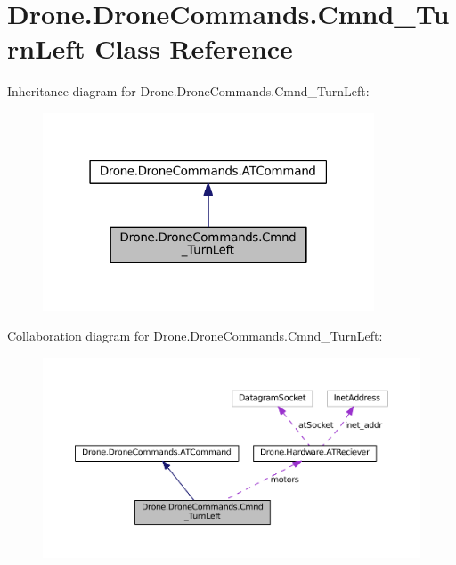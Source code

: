 \hypertarget{class_drone_1_1_drone_commands_1_1_cmnd___turn_left}{}\section{Drone.\+Drone\+Commands.\+Cmnd\+\_\+\+Turn\+Left Class Reference}
\label{class_drone_1_1_drone_commands_1_1_cmnd___turn_left}


Inheritance diagram for Drone.\+Drone\+Commands.\+Cmnd\+\_\+\+Turn\+Left\+:\nopagebreak
\begin{figure}[H]
\begin{center}
\leavevmode
\includegraphics[width=279pt]{class_drone_1_1_drone_commands_1_1_cmnd___turn_left__inherit__graph}
\end{center}
\end{figure}


Collaboration diagram for Drone.\+Drone\+Commands.\+Cmnd\+\_\+\+Turn\+Left\+:\nopagebreak
\begin{figure}[H]
\begin{center}
\leavevmode
\includegraphics[width=350pt]{class_drone_1_1_drone_commands_1_1_cmnd___turn_left__coll__graph}
\end{center}
\end{figure}
